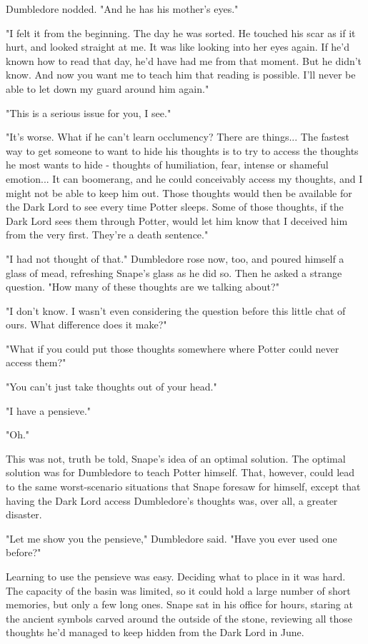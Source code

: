 \documentclass[a4paper,11pt]{article}
\begin{document}
Dumbledore nodded. "And he has his mother's eyes."

"I felt it from the beginning. The day he was sorted. He touched his scar as if it hurt, and looked straight at me. It was like looking into her eyes again. If he'd known how to read that day, he'd have had me from that moment. But he didn't know. And now you want me to teach him that reading is possible. I'll never be able to let down my guard around him again."

"This is a serious issue for you, I see."

"It's worse. What if he can't learn occlumency? There are things... The fastest way to get someone to want to hide his thoughts is to try to access the thoughts he most wants to hide - thoughts of humiliation, fear, intense or shameful emotion... It can boomerang, and he could conceivably access my thoughts, and I might not be able to keep him out. Those thoughts would then be available for the Dark Lord to see every time Potter sleeps. Some of those thoughts, if the Dark Lord sees them through Potter, would let him know that I deceived him from the very first. They're a death sentence."

"I had not thought of that." Dumbledore rose now, too, and poured himself a glass of mead, refreshing Snape's glass as he did so. Then he asked a strange question. "How many of these thoughts are we talking about?"

"I don't know. I wasn't even considering the question before this little chat of ours. What difference does it make?"

"What if you could put those thoughts somewhere where Potter could never access them?"

"You can't just take thoughts out of your head."

"I have a pensieve."

"Oh."

This was not, truth be told, Snape's idea of an optimal solution. The optimal solution was for Dumbledore to teach Potter himself. That, however, could lead to the same worst-scenario situations that Snape foresaw for himself, except that having the Dark Lord access Dumbledore's thoughts was, over all, a greater disaster.

"Let me show you the pensieve," Dumbledore said. "Have you ever used one before?"

Learning to use the pensieve was easy. Deciding what to place in it was hard. The capacity of the basin was limited, so it could hold a large number of short memories, but only a few long ones. Snape sat in his office for hours, staring at the ancient symbols carved around the outside of the stone, reviewing all those thoughts he'd managed to keep hidden from the Dark Lord in June.
\end{document}
